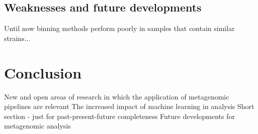 \documentclass{article}
\begin{document}
\subsection*{Weaknesses and future developments}
Until now binning methods perform poorly in samples that contain similar strains...

\section*{Conclusion}
New and open areas of research in which the application of metagenomic pipelines are relevant
The increased impact of machine learning in analysis
Short section - just for past-present-future completeness
Future developments for metagenomic analysis


\end{document}
